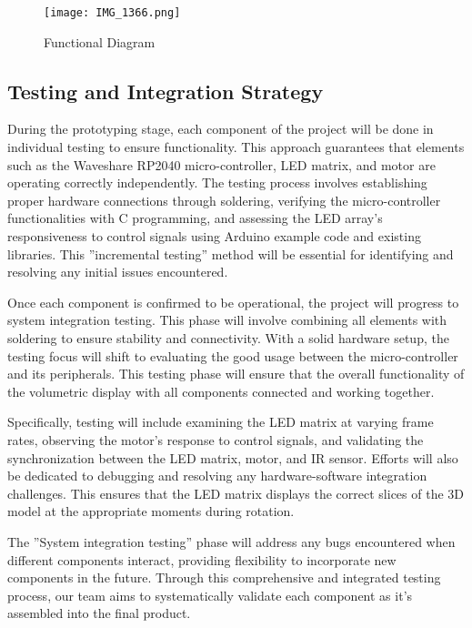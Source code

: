 \documentclass[11pt,journal]{IEEEtran}
\begin{document}

\begin{figure}[h]
    \centering
    \texttt{[image: IMG\_1366.png]}
   
    \caption{Functional Diagram}
    \label{fig:enter-label}
\end{figure}

\subsection{Testing and Integration Strategy}
During the prototyping stage, each component of the project will be done in individual testing to ensure functionality. This approach guarantees that elements such as the Waveshare RP2040 micro-controller, LED matrix, and motor are operating correctly independently. The testing process involves establishing proper hardware connections through soldering, verifying the micro-controller functionalities with C programming, and assessing the LED array's responsiveness to control signals using Arduino  example code and existing libraries. This ''incremental testing'' method will be essential for identifying and resolving any initial issues encountered.

Once each component is confirmed to be operational, the project will progress to system integration testing. This phase will involve combining all elements with  soldering  to ensure stability and connectivity. With a solid hardware setup, the testing focus will shift to evaluating the good usage between the micro-controller and its peripherals. This testing phase will ensure that the overall functionality of the volumetric display with all components connected and working together.

Specifically, testing will include examining the LED matrix at varying frame rates, observing the motor's response to control signals, and validating the synchronization between the LED matrix, motor, and IR sensor. Efforts will also be dedicated to debugging and resolving any hardware-software integration challenges. This ensures that the LED matrix displays the correct slices of the 3D model at the appropriate moments during rotation.

The ''System integration testing'' phase will address any bugs encountered when different components interact, providing flexibility to incorporate new components in the future. Through this comprehensive and integrated testing process, our team aims to systematically validate each component as it's assembled into the final product.
\end{document}

